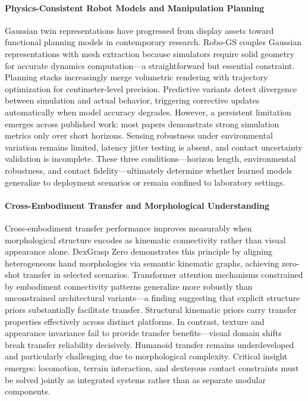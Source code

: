 ﻿\documentclass[11pt,a4paper]{article}
\begin{document}
\paragraph{Physics-Consistent Robot Models and Manipulation Planning}
Gaussian twin representations have progressed from display assets toward functional planning models in contemporary research. Robo-GS couples Gaussian representations with mesh extraction because simulators require solid geometry for accurate dynamics computation—a straightforward but essential constraint. Planning stacks increasingly merge volumetric rendering with trajectory optimization for centimeter-level precision. Predictive variants detect divergence between simulation and actual behavior, triggering corrective updates automatically when model accuracy degrades. However, a persistent limitation emerges across published work: most papers demonstrate strong simulation metrics only over short horizons. Sensing robustness under environmental variation remains limited, latency jitter testing is absent, and contact uncertainty validation is incomplete. These three conditions—horizon length, environmental robustness, and contact fidelity—ultimately determine whether learned models generalize to deployment scenarios or remain confined to laboratory settings.

\paragraph{Cross-Embodiment Transfer and Morphological Understanding}
Cross-embodiment transfer performance improves measurably when morphological structure encodes as kinematic connectivity rather than visual appearance alone. DexGrasp Zero demonstrates this principle by aligning heterogeneous hand morphologies via semantic kinematic graphs, achieving zero-shot transfer in selected scenarios. Transformer attention mechanisms constrained by embodiment connectivity patterns generalize more robustly than unconstrained architectural variants—a finding suggesting that explicit structure priors substantially facilitate transfer. Structural kinematic priors carry transfer properties effectively across distinct platforms. In contrast, texture and appearance invariance fail to provide transfer benefits—visual domain shifts break transfer reliability decisively. Humanoid transfer remains underdeveloped and particularly challenging due to morphological complexity. Critical insight emerges: locomotion, terrain interaction, and dexterous contact constraints must be solved jointly as integrated systems rather than as separate modular components.
\end{document}
